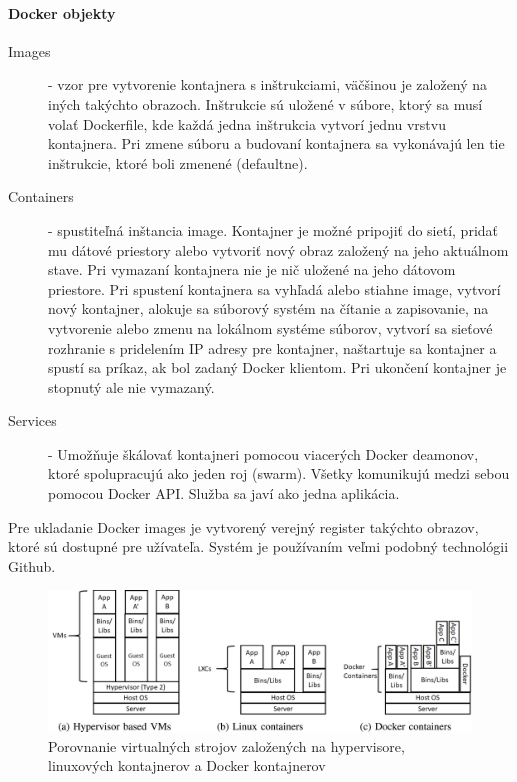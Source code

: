 \documentclass[../../main.tex]{subfiles}
\begin{document}
 \paragraph{Docker objekty}
 \begin{description}
    \item[Images] - vzor pre vytvorenie kontajnera s inštrukciami, väčšinou je založený na iných takýchto obrazoch. Inštrukcie sú uložené v súbore, ktorý sa musí volať Dockerfile, kde každá jedna inštrukcia vytvorí jednu vrstvu kontajnera. Pri zmene súboru a budovaní kontajnera sa vykonávajú len tie inštrukcie, ktoré boli zmenené (defaultne).
    \item[Containers] - spustiteľná inštancia image. Kontajner je možné pripojiť do sietí, pridať mu dátové priestory alebo vytvoriť nový obraz založený na jeho aktuálnom stave. Pri vymazaní kontajnera nie je nič uložené na jeho dátovom priestore. Pri spustení kontajnera sa vyhľadá alebo stiahne image, vytvorí nový kontajner, alokuje sa súborový systém na čítanie a zapisovanie, na vytvorenie alebo zmenu na lokálnom systéme súborov, vytvorí sa sieťové rozhranie s pridelením IP adresy pre kontajner,  naštartuje sa kontajner a spustí sa príkaz, ak bol zadaný Docker klientom.  Pri ukončení kontajner je stopnutý ale nie vymazaný.
    \item[Services] - Umožňuje škálovať kontajneri pomocou viacerých Docker deamonov, ktoré spolupracujú ako jeden roj (swarm). Všetky komunikujú medzi sebou pomocou Docker API. Služba sa javí ako jedna aplikácia.
 \end{description}
 \vspace{1.5cm}
 Pre ukladanie Docker images je vytvorený verejný register takýchto obrazov, ktoré sú dostupné pre užívateľa. Systém je používaním veľmi podobný technológii Github.\cite{docker_overview}
 




% 



\begin{figure}[h!]
  \includegraphics[scale=0.9]{images/containers_vs_LXC.jpg}
  \centering
  \caption{Porovnanie virtualných strojov založených na hypervisore, linuxových kontajnerov a Docker kontajnerov\cite{WAN201897}}
\end{figure}
\end{document}
